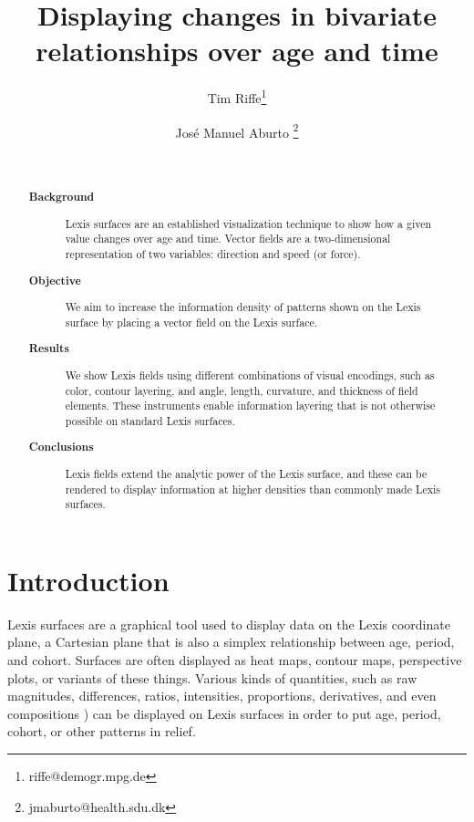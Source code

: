 \documentclass{article}
\begin{document}
\title{Displaying changes in bivariate relationships over age and time}

\author[1]{Tim Riffe\thanks{riffe@demogr.mpg.de}}
\author[2]{Jos\'e Manuel Aburto \thanks{jmaburto@health.sdu.dk}}

\maketitle

\begin{abstract}
~
\begin{description}
\item[\textbf{Background}] Lexis surfaces are an established visualization
technique to show how a given value changes over age and time. Vector fields are
a two-dimensional representation of two variables: direction and speed (or
force). 
\item[\textbf{Objective}] We aim to increase the information density of patterns
shown on the Lexis surface by placing a vector field on the Lexis surface. 
\item[\textbf{Results}] We show Lexis fields using different combinations of
visual encodings, such as color, contour layering, and angle, length, curvature,
and thickness of field elements. These instruments enable information layering
that is not otherwise possible on standard Lexis surfaces.
\item[\textbf{Conclusions}] Lexis fields extend the analytic power of the Lexis
surface, and these can be rendered to display information at higher densities
than commonly made Lexis surfaces.
\end{description}
\end{abstract}


\section*{Introduction}
Lexis surfaces are a graphical tool used to display data on the Lexis coordinate plane, a Cartesian plane that is also a simplex relationship between age, period, and cohort. Surfaces are often displayed as heat maps, contour maps, perspective plots, or variants of these things. Various kinds of quantities, such as raw magnitudes, differences, ratios, intensities, proportions, derivatives, and even compositions \citep{scholey2017visualizing}) can be displayed on Lexis surfaces in order to put age, period, cohort, or other patterns in relief. 
\end{document}
